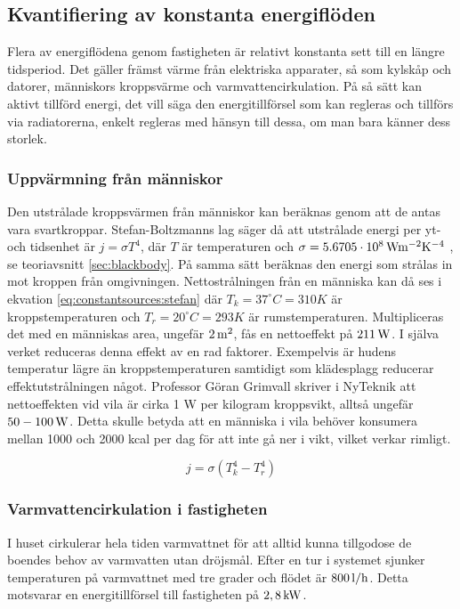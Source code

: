 \subsection{Kvantifiering av konstanta energiflöden}

Flera av energiflödena genom fastigheten är relativt konstanta sett till en längre tidsperiod. Det gäller främst värme från elektriska apparater, så som kylskåp och datorer, människors kroppsvärme och varmvattencirkulation. På så sätt kan aktivt tillförd energi, det vill säga den energitillförsel som kan regleras och tillförs via radiatorerna, enkelt regleras med hänsyn till dessa, om man bara känner dess storlek.

\subsubsection{Uppvärmning från människor}
Den utstrålade kroppsvärmen från människor kan beräknas genom att de antas vara svartkroppar. Stefan-Boltzmanns lag säger då att utstrålade energi per yt- och tidsenhet är $j=\sigma T^4$, där $T$ är temperaturen och $\sigma=\unit[5.6705\cdot 10^8]{Wm^{-2}K^{-4}}$ \cite{physicshandbook}, se teoriavsnitt \ref{sec:blackbody}. På samma sätt beräknas den energi som strålas in mot kroppen från omgivningen. Nettostrålningen från en människa kan då ses i ekvation \eqref{eq:constantsources:stefan} där $T_k=37^{\circ}C=310K$ är kroppstemperaturen och $T_r=20^{\circ}C=293K$ är rumstemperaturen. Multipliceras det med en människas area, ungefär $\unit[2]{m^2}$, fås en nettoeffekt på $\unit[211]{W}$. I själva verket reduceras denna effekt av en rad faktorer. Exempelvis är hudens temperatur lägre än kroppstemperaturen samtidigt som klädesplagg reducerar effektutstrålningen något. Professor Göran Grimvall skriver i NyTeknik att nettoeffekten vid vila är cirka 1 W per kilogram kroppsvikt, alltså ungefär $\unit[50-100]{W}$\cite{Grimvall}. Detta skulle betyda att en människa i vila behöver konsumera mellan 1000 och 2000 kcal per dag för att inte gå ner i vikt, vilket verkar rimligt.

\begin{equation}
\label{eq:constantsources:stefan}
j=\sigma \left( T_k^4 - T_r^4 \right)
\end{equation}
\noindent

\subsubsection{Varmvattencirkulation i fastigheten}
I huset cirkulerar hela tiden varmvattnet för att alltid kunna tillgodose de boendes behov av varmvatten utan dröjsmål. Efter en tur i systemet sjunker temperaturen på varmvattnet med tre grader och flödet är $\unit[800]{l/h}$. Detta motsvarar en energitillförsel till fastigheten på $\unit[2,8]{kW}$.

